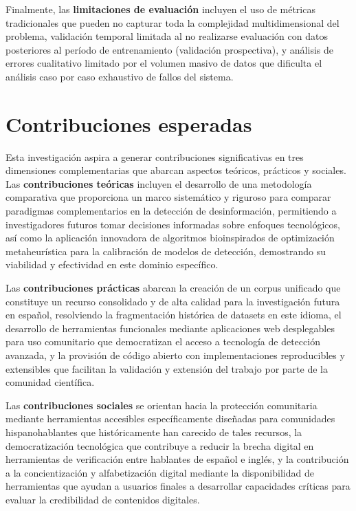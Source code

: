 Finalmente, las \textbf{limitaciones de evaluación} incluyen el uso de métricas tradicionales que pueden no capturar toda la complejidad multidimensional del problema, validación temporal limitada al no realizarse evaluación con datos posteriores al período de entrenamiento (validación prospectiva), y análisis de errores cualitativo limitado por el volumen masivo de datos que dificulta el análisis caso por caso exhaustivo de fallos del sistema.

\section{Contribuciones esperadas}

Esta investigación aspira a generar contribuciones significativas en tres dimensiones complementarias que abarcan aspectos teóricos, prácticos y sociales. Las \textbf{contribuciones teóricas} incluyen el desarrollo de una metodología comparativa que proporciona un marco sistemático y riguroso para comparar paradigmas complementarios en la detección de desinformación, permitiendo a investigadores futuros tomar decisiones informadas sobre enfoques tecnológicos, así como la aplicación innovadora de algoritmos bioinspirados de optimización metaheurística para la calibración de modelos de detección, demostrando su viabilidad y efectividad en este dominio específico.

Las \textbf{contribuciones prácticas} abarcan la creación de un corpus unificado que constituye un recurso consolidado y de alta calidad para la investigación futura en español, resolviendo la fragmentación histórica de datasets en este idioma, el desarrollo de herramientas funcionales mediante aplicaciones web desplegables para uso comunitario que democratizan el acceso a tecnología de detección avanzada, y la provisión de código abierto con implementaciones reproducibles y extensibles que facilitan la validación y extensión del trabajo por parte de la comunidad científica.

Las \textbf{contribuciones sociales} se orientan hacia la protección comunitaria mediante herramientas accesibles específicamente diseñadas para comunidades hispanohablantes que históricamente han carecido de tales recursos, la democratización tecnológica que contribuye a reducir la brecha digital en herramientas de verificación entre hablantes de español e inglés, y la contribución a la concientización y alfabetización digital mediante la disponibilidad de herramientas que ayudan a usuarios finales a desarrollar capacidades críticas para evaluar la credibilidad de contenidos digitales.


